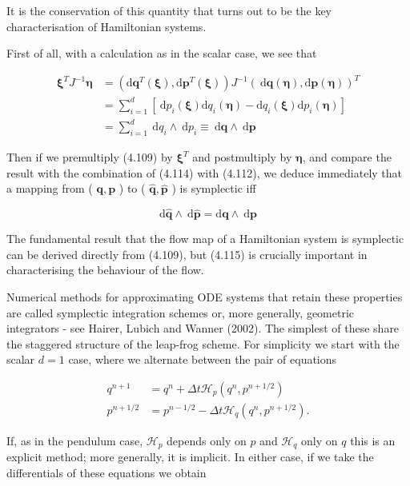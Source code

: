 \documentclass[10pt]{article}
\begin{document}
It is the conservation of this quantity that turns out to be the key characterisation of Hamiltonian systems.

First of all, with a calculation as in the scalar case, we see that

\[
\begin{aligned}
\boldsymbol{\xi}^{T} J^{-1} \boldsymbol{\eta} & =\left(\mathrm{d} \mathbf{q}^{T}(\boldsymbol{\xi}), \mathrm{d} \mathbf{p}^{T}(\boldsymbol{\xi})\right) J^{-1}(\mathrm{~d} \mathbf{q}(\boldsymbol{\eta}), \mathrm{d} \mathbf{p}(\boldsymbol{\eta}))^{T} \\
& =\sum_{i=1}^{d}\left[\mathrm{~d} p_{i}(\boldsymbol{\xi}) \mathrm{d} q_{i}(\boldsymbol{\eta})-\mathrm{d} q_{i}(\boldsymbol{\xi}) \mathrm{d} p_{i}(\boldsymbol{\eta})\right] \\
& =\sum_{i=1}^{d} \mathrm{~d} q_{i} \wedge \mathrm{~d} p_{i} \equiv \mathrm{~d} \mathbf{q} \wedge \mathrm{~d} \mathbf{p}
\end{aligned}
\]

Then if we premultiply (4.109) by \(\boldsymbol{\xi}^{T}\) and postmultiply by \(\boldsymbol{\eta}\), and compare the result with the combination of (4.114) with (4.112), we deduce immediately that a mapping from ( \(\mathbf{q}, \mathbf{p}\) ) to ( \(\hat{\mathbf{q}}, \hat{\mathbf{p}}\) ) is symplectic iff

\[
\mathrm{d} \hat{\mathbf{q}} \wedge \mathrm{~d} \hat{\mathbf{p}}=\mathrm{d} \mathbf{q} \wedge \mathrm{~d} \mathbf{p}
\]

The fundamental result that the flow map of a Hamiltonian system is symplectic can be derived directly from (4.109), but (4.115) is crucially important in characterising the behaviour of the flow.

Numerical methods for approximating ODE systems that retain these properties are called symplectic integration schemes or, more generally, geometric integrators - see Hairer, Lubich and Wanner (2002). The simplest of these share the staggered structure of the leap-frog scheme. For simplicity we start with the scalar \(d=1\) case, where we alternate between the pair of equations

\[
\begin{aligned}
q^{n+1} & =q^{n}+\Delta t \mathcal{H}_{p}\left(q^{n}, p^{n+1 / 2}\right) \\
p^{n+1 / 2} & =p^{n-1 / 2}-\Delta t \mathcal{H}_{q}\left(q^{n}, p^{n+1 / 2}\right) .
\end{aligned}
\]

If, as in the pendulum case, \(\mathcal{H}_{p}\) depends only on \(p\) and \(\mathcal{H}_{q}\) only on \(q\) this is an explicit method; more generally, it is implicit. In either case, if we take the differentials of these equations we obtain
\end{document}
